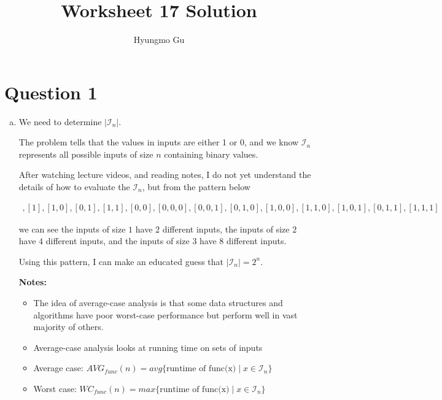 \documentclass[12pt]{article}
\begin{document}
\title{Worksheet 17 Solution}
\author{Hyungmo Gu}
\maketitle

\section*{Question 1}
\begin{enumerate}[a.]
    \item

    We need to determine $\lvert \mathcal{I}_n \rvert$.

    \bigskip

    The problem tells that the values in inputs are either 1 or 0, and we know
    $\mathcal{I}_n$ represents all possible inputs of size $n$ containing binary values.

    \bigskip

    After watching lecture videos, and reading notes, I do not yet understand the details
    of how to evaluate the $\mathcal{I}_n$, but from the pattern below

    \begin{align*}
        [0], [1], [1,0], [0,1], [1,1], [0,0], [0,0,0],[0,0,1],[0,1,0],[1,0,0],
        [1,1,0],[1,0,1],[0,1,1],[1,1,1]
    \end{align*}

    we can see the inputs of size $1$ have $2$ different inputs, the inputs of size $2$ have $4$
    different inputs, and the inputs of size $3$ have $8$ different inputs.

    \bigskip

    Using this pattern, I can make an educated guess that $\lvert \mathcal{I}_n \rvert = 2^n$.

    \bigskip

    \textbf{Notes:}

    \begin{itemize}
     \item The idea of average-case analysis is that some data structures and
     algorithms have poor worst-case performance but perform well in vast majority
     of others.

    \item Average-case analysis looks at running time on sets of inputs
    \item Average case: $AVG_{func}(n) = avg \{ \text{runtime of func(x)} \mid x \in \mathcal{I}_n \}$
    \item Worst case: $WC_{func}(n) = max \{ \text{runtime of func(x)} \mid x \in \mathcal{I}_n \}$


\end{itemize}
\end{enumerate}
\end{document}
